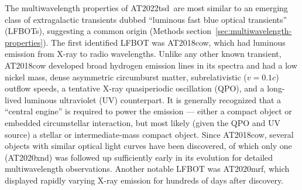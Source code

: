 \documentclass{nature_plusfigure}
\newcommand{\at}{AT2022tsd}
\begin{document}
The multiwavelength properties of \at\ are most similar to an emerging class of extragalactic transients dubbed ``luminous fast blue optical transients'' (LFBOTs\cite{Metzger2022}), suggesting a common origin (Methods section~\ref{sec:multiwavelength-properties}). The first identified LFBOT was AT2018cow\cite{Prentice2018}, which had luminous emission from X-ray to radio wavelengths\cite{Margutti2019}. Unlike any other known transient, AT2018cow developed broad hydrogen emission lines in its spectra\cite{Perley2019} and had a low nickel mass\cite{Perley2019}, dense\cite{Ho2019} asymmetric\cite{Margutti2019,Maund2023} circumburst matter, subrelativistic ($v=0.1c$)\cite{Ho2019} outflow speeds, a tentative X-ray quasiperiodic oscillation (QPO\cite{Pasham2021,Zhang2022}), and a long-lived luminous ultraviolet (UV) counterpart\cite{Sun2023}. It is generally recognized that a ``central engine'' is required to power the emission --- either a compact object\cite{Prentice2018,Perley2019,Margutti2019,Ho2019} or embedded circumstellar interaction\cite{Margutti2019}, but most likely (given the QPO and UV source) a stellar\cite{Margutti2019,Pasham2021} or intermediate-mass\cite{Kuin2019,Perley2019,Zhang2022,Chen2023} compact object. 
Since AT2018cow, several objects with similar optical light curves have been discovered\cite{Coppejans2020,Ho2020_Koala,Perley2021,Yao2022}, of which only one (AT2020xnd\cite{Perley2021}) was followed up sufficiently early in its evolution for detailed multiwavelength observations\cite{Bright2022,Ho2022_AT2020xnd}.
Another notable LFBOT was AT2020mrf\cite{Yao2022}, which displayed rapidly varying X-ray emission for hundreds of days after discovery.
\end{document}
